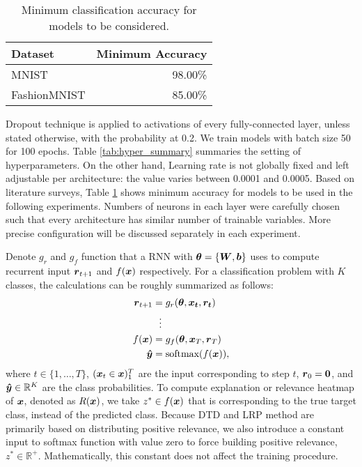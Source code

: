 \begin{table}[h]
\centering
\begin{tabular}{ll}
\multicolumn{1}{l|}{\textbf{Dataset}} & \textbf{Minimum Accuracy} \\ \hline
\multicolumn{1}{l|}{MNIST}            & \multicolumn{1}{r}{98.00\%}  \\
\multicolumn{1}{l|}{FashionMNIST}    & \multicolumn{1}{r}{85.00\%}  \\
\end{tabular}
\caption{Minimum classification accuracy for models to be considered.}
\label{tab:min_acc}
\end{table}



Dropout technique \cite{SrivastavaDropoutSimpleWay2014} is applied to activations of every fully-connected layer, unless stated otherwise,  with the probability at 0.2. We train models with batch size 50 for 100 epochs. Table \ref{tab:hyper_summary} summaries the setting of hyperparameters. On the other hand, Learning rate is not globally fixed and left adjustable per architecture: the value varies between 0.0001 and 0.0005. Based on literature surveys, Table \ref{tab:min_acc} shows minimum accuracy for models to be used in the following experiments.  Numbers of neurons in each layer were carefully chosen such that every architecture has similar number of trainable variables. More precise configuration will be discussed separately in each experiment. 

Denote $g_r$ and $g_{f}$ function that a RNN with $\boldsymbol{\theta} = \{ \patmatrix{W}, \boldsymbol{b} \}$ uses to compute recurrent input $\patvector{r}_{t+1}$ and $f(\boldsymbol{x})$ respectively. For a classification problem with $K$ classes, the calculations can be  roughly summarized as follows: 
 \begin{align*}
 	\patvector{r}_{t+1} &= g_r(\patvector{\theta}, \patvector{x_t}, \patvector{r_t}) \\
 	 &\ \ \vdots\\
f(\x) &= g_{f}(\patvector{\theta}, \patvector{x}_{T},  \patvector{r}_{T}) \\
 	\patvector{\hat{y}} &= \text{softmax}(f(\x)),
 \end{align*}
 where $t \in \{1, \dots, T\}$, $(\boldsymbol{x}_t \in \boldsymbol{x})_1^{T}$ are the input corresponding to  step $t$, $\patvector{r}_0 = \patvector{0}$, and $\patvector{\hat{y}} \in \mathbb{R}^K$ are the class probabilities. To compute explanation or relevance heatmap of $\boldsymbol{x}$, denoted as $R(\boldsymbol{x})$, we take $z^* \in f(\boldsymbol{x})$ that is corresponding to the true target class, instead of the predicted class.  Because DTD and LRP method are primarily  based on distributing positive relevance, we also introduce a constant input to softmax function with value zero to force building positive relevance, $z^* \in \mathbb{R}^+$. Mathematically, this constant does not affect the training procedure.

